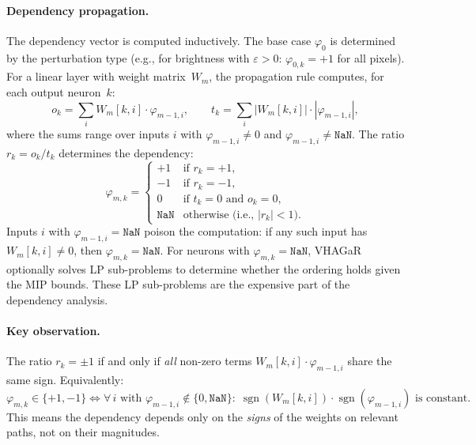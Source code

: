 \documentclass[11pt]{article}
\theoremstyle{definition}
\newcommand{\ep}{\varepsilon}
\newcommand{\sgn}{\operatorname{sgn}}
\begin{document}
\paragraph{Dependency propagation.}
The dependency vector is computed inductively. The base case $\varphi_0$ is determined by the perturbation type (e.g., for brightness with $\ep > 0$: $\varphi_{0,k} = +1$ for all pixels). For a linear layer with weight matrix~$W_m$, the propagation rule computes, for each output neuron~$k$:
\begin{equation}
  \label{eq:dep-prop}
  o_k = \sum_{i} W_{m}[k,i] \cdot \varphi_{m-1,i}, \qquad
  t_k = \sum_{i} |W_{m}[k,i]| \cdot |\varphi_{m-1,i}|,
\end{equation}
where the sums range over inputs $i$ with $\varphi_{m-1,i} \neq 0$ and $\varphi_{m-1,i} \neq \mathtt{NaN}$.
The ratio $r_k = o_k / t_k$ determines the dependency:
\begin{equation}
  \label{eq:dep-ratio}
  \varphi_{m,k} = \begin{cases}
    +1 & \text{if } r_k = +1, \\
    -1 & \text{if } r_k = -1, \\
    0 & \text{if } t_k = 0 \text{ and } o_k = 0, \\
    \mathtt{NaN} & \text{otherwise (i.e., } |r_k| < 1 \text{).}
  \end{cases}
\end{equation}
Inputs $i$ with $\varphi_{m-1,i} = \mathtt{NaN}$ poison the computation: if any such input has $W_m[k,i] \neq 0$, then $\varphi_{m,k} = \mathtt{NaN}$. For neurons with $\varphi_{m,k} = \mathtt{NaN}$, VHAGaR optionally solves LP sub-problems to determine whether the ordering holds given the MIP bounds. These LP sub-problems are the expensive part of the dependency analysis.

\paragraph{Key observation.}
The ratio $r_k = \pm 1$ if and only if \emph{all} non-zero terms $W_m[k,i] \cdot \varphi_{m-1,i}$ share the same sign. Equivalently:
\begin{equation}
  \label{eq:same-sign}
  \varphi_{m,k} \in \{+1, -1\} \iff \forall\, i \text{ with } \varphi_{m-1,i} \notin \{0, \mathtt{NaN}\}: \; \sgn(W_m[k,i]) \cdot \sgn(\varphi_{m-1,i}) \text{ is constant.}
\end{equation}
This means the dependency depends only on the \emph{signs} of the weights on relevant paths, not on their magnitudes.
\end{document}
